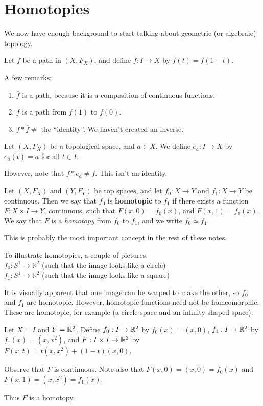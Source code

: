 

\section{Homotopies} We now have enough background to start talking about geometric (or algebraic) topology.
\begin{definition}
	Let $f$ be a path in $(X,F_X)$, and define $\overline{f} : I \to X$ by $\overline{f} (t) = f(1-t)$. 
\end{definition}

A few remarks: 
\begin{enumerate}
	\item $\overline{f}$ is a path, because it is a composition of continuous functions. 
	\item $\overline{f}$ is a path from $f(1)$ to $f(0)$. 
	\item $f \ast \overline{f} \neq $ the ``identity''. We haven't created an inverse. 
\end{enumerate}
\begin{definition}
	Let $(X,F_X)$ be a topological space, and $a\in X$. We define $e_a: I\to X$ by $e_a (t) = a$ for all $t\in I$. 
\end{definition}

However, note that $f\ast e_a \neq f$. This isn't an identity.
\begin{definition}
	Let $(X,F_X)$ and $(Y,F_Y)$ be top spaces, and let $f_0: X \to Y$ and $f_1:X\to Y$ be continuous. Then we say that $f_0$ is \textbf{homotopic} to $f_1$ if there exists a function $F:X\times I \to Y$, continuous, such that $F(x,0) = f_0 (x)$, and $F(x,1) = f_1(x)$. We say that $F$ is a \textit{homotopy} from $f_0$ to $f_1$, and we write $f_0 \simeq f_1$. 
\end{definition}

This is probably the most important concept in the rest of these notes.

To illustrate homotopies, a couple of pictures.\\
$f_0: S^1 \rightarrow \mathbb{R}^2$ (such that the image looks like a circle)\\
$f_1: S^1 \rightarrow \mathbb{R}^2$ (such that the image looks like a square)\\
\placeholder

It is visually apparent that one image can be warped to make the other, so $f_0$ and $f_1$ are homotopic. However, homotopic functions need not be homeomorphic. These are homotopic, for example (a circle space and an infinity-shaped space). \placeholder
\begin{example}
	Let $X = I$ and $Y = \mathbb R^2$. Define $f_0: I \rightarrow \mathbb R^2$ by $f_0(x) = (x,0)$, $f_1: I \rightarrow \mathbb R^2$ by $f_1(x) = (x,x^2)$, and $F: I \times I \rightarrow \mathbb R^2$ by $F(x, t) = t(x, x^2) + (1-t)(x, 0)$.
	
	Observe that $F$ is continuous. Note also that $F(x,0) = (x, 0) = f_0(x)$ and $F(x,1) = (x, x^2) = f_1(x)$.
	
	Thus $F$ is a homotopy. 
\end{example}

